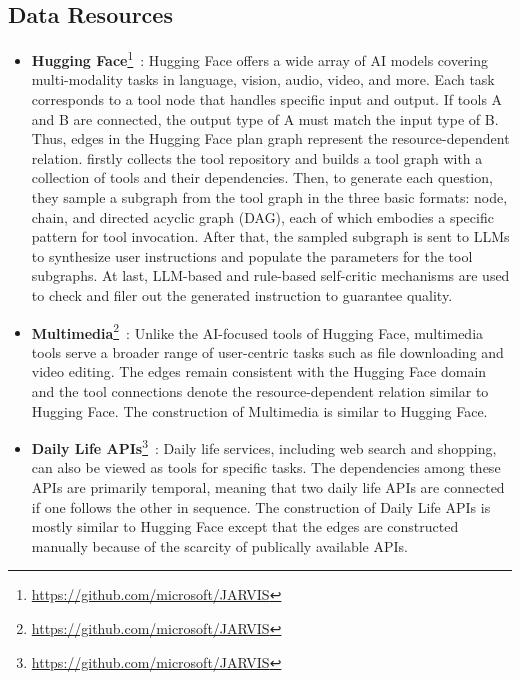 \subsection{Data Resources}
\begin{itemize}[leftmargin=*]
    \item \textbf{Hugging Face}\footnote{\href{https://github.com/microsoft/JARVIS}{https://github.com/microsoft/JARVIS}}~\cite{shen2023taskbench}: Hugging Face offers a wide array of AI models covering multi-modality tasks in language, vision, audio, video, and more. Each task corresponds to a tool node that handles specific input and output. If tools A and B are connected, the output type of A must match the input type of B. Thus, edges in the Hugging Face plan graph represent the resource-dependent relation. \cite{shen2023taskbench} firstly collects the tool repository and builds a tool graph with a collection of tools and their dependencies. Then, to generate each question, they sample a subgraph from the tool graph in the three basic formats: node, chain, and directed acyclic graph (DAG), each of which embodies a specific pattern for tool invocation. After that, the sampled subgraph is sent to LLMs to synthesize user instructions and populate the parameters for the tool subgraphs. At last, LLM-based and rule-based self-critic mechanisms are used to check and filer out the generated instruction to guarantee quality.

    \item \textbf{Multimedia}\footnote{\href{https://github.com/microsoft/JARVIS}{https://github.com/microsoft/JARVIS}}~\cite{shen2023taskbench}: Unlike the AI-focused tools of Hugging Face, multimedia tools serve a broader range of user-centric tasks such as file downloading and video editing. The edges remain consistent with the Hugging Face domain and the tool connections denote the resource-dependent relation similar to Hugging Face. The construction of Multimedia is similar to Hugging Face.
    
    \item \textbf{Daily Life APIs}\footnote{\href{https://github.com/microsoft/JARVIS}{https://github.com/microsoft/JARVIS}}~\cite{shen2023taskbench}: Daily life services, including web search and shopping, can also be viewed as tools for specific tasks. The dependencies among these APIs are primarily temporal, meaning that two daily life APIs are connected if one follows the other in sequence. The construction of Daily Life APIs is mostly similar to Hugging Face except that the edges are constructed manually because of the scarcity of publically available APIs.


\end{itemize}
